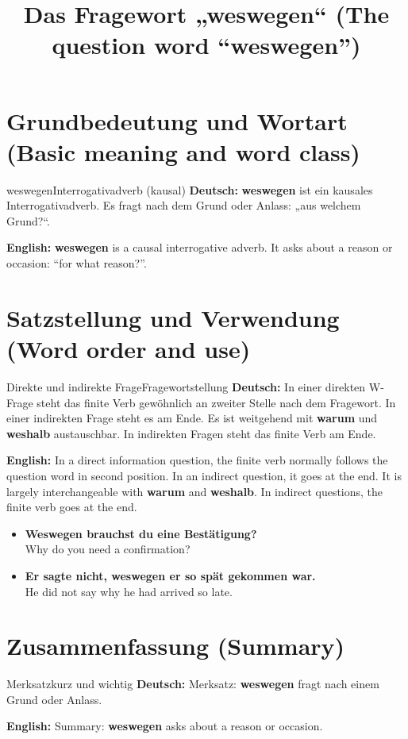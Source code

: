 \documentclass[a4paper,11pt]{article}
\title{Das Fragewort „weswegen“ (The question word “weswegen”)}
\date{}
\newcommand{\GermanText}[1]{\textbf{Deutsch: }#1\par}
\newcommand{\EnglishText}[1]{{\small\color{SoftGray}\textbf{English: }#1\par}}
\newcommand{\ExampleItem}[2]{\item \textbf{#1}\\{\small\color{SoftGray}#2}}
\begin{document}
\maketitle
\tableofcontents
\newpage
\section{Grundbedeutung und Wortart (Basic meaning and word class)}
\begin{grammarentry}{weswegen}{Interrogativadverb (kausal)}
\GermanText{\textbf{weswegen} ist ein kausales Interrogativadverb. Es fragt nach dem Grund oder Anlass: „aus welchem Grund?“.}
\EnglishText{\textbf{weswegen} is a causal interrogative adverb. It asks about a reason or occasion: “for what reason?”.}

\end{grammarentry}
\section{Satzstellung und Verwendung (Word order and use)}
\begin{grammarentry}{Direkte und indirekte Frage}{Fragewortstellung}
\GermanText{In einer direkten W-Frage steht das finite Verb gewöhnlich an zweiter Stelle nach dem Fragewort. In einer indirekten Frage steht es am Ende. Es ist weitgehend mit \textbf{warum} und \textbf{weshalb} austauschbar. In indirekten Fragen steht das finite Verb am Ende.}
\EnglishText{In a direct information question, the finite verb normally follows the question word in second position. In an indirect question, it goes at the end. It is largely interchangeable with \textbf{warum} and \textbf{weshalb}. In indirect questions, the finite verb goes at the end.}
\end{grammarentry}
\begin{exbox}\begin{itemize}
\ExampleItem{Weswegen brauchst du eine Bestätigung?}{Why do you need a confirmation?}
\ExampleItem{Er sagte nicht, weswegen er so spät gekommen war.}{He did not say why he had arrived so late.}
\end{itemize}\end{exbox}
\section{Zusammenfassung (Summary)}
\begin{grammarentry}{Merksatz}{kurz und wichtig}
\GermanText{Merksatz: \textbf{weswegen} fragt nach einem Grund oder Anlass.}
\EnglishText{Summary: \textbf{weswegen} asks about a reason or occasion.}
\end{grammarentry}
\end{document}
